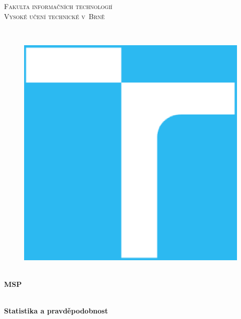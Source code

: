 \documentclass[11pt,a4paper]{article}
\begin{document}
\nocite{*}

\begin{titlepage}

    \begin{center}
        \vfill {%
            \Huge{%
                \textsc{%
                    Fakulta informačních technologií\\[3mm]%
                    Vysoké učení technické v~Brně%
                }%
            }%
        }%

        \hfill\\[15mm]

        \begin{figure}[!h]
            \centering
            \includegraphics[scale=0.3]{vutbr-fit-logo.eps}
        \end{figure}

        \hfill\\[10mm]

        \Huge{
            \textbf{
                MSP
            }
        }

        \hfill\\[-10mm]

        \huge{
            \textbf{
                Statistika a pravděpodobnost
            }
        }


\end{center}
\end{titlepage}
\end{document}
